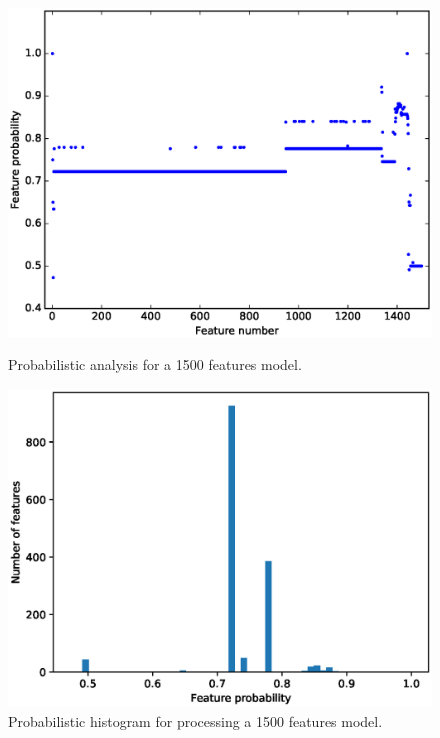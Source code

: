 \begin{figure}[h]
	\centering
	\begin{minipage}[b]{0.48\textwidth}
		\includegraphics[width=\textwidth]{plot_probs_probs.eps}
\caption{Probabilistic analysis for a 1500 features model.}\label{fig:plot:probs:probs}
	\end{minipage}
	\hfill
	\begin{minipage}[b]{0.48\textwidth}
		\includegraphics[width=\textwidth]{FeatureModel1500Features_histogram.eps}
	\caption{Probabilistic histogram for processing a 1500 features model.}\label{fig:plot:probs:probs:sorted}
	\end{minipage}
\end{figure}


